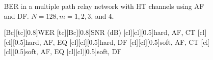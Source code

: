\begin{figure}
{}
\caption{BER in a multiple path relay network with HT channels using AF and DF.  $N = 128, m = 1, 2, 3$, and $4$.}
\label{fig:mp_af_df_ber_plots_HT}
\end{figure}

\begin{figure}
    [Bc][tc][0.8]{WER}
    [tc][Bc][0.8]{SNR (dB)}
    [cl][cl][0.5]{hard, AF, CT}
    [cl][cl][0.5]{hard, AF, EQ}
    [cl][cl][0.5]{hard, DF}
    [cl][cl][0.5]{soft, AF, CT}
    [cl][cl][0.5]{soft, AF, EQ}
    [cl][cl][0.5]{soft, DF}

\centerline{
	 \\
}
\centerline{
}
\end{figure}
